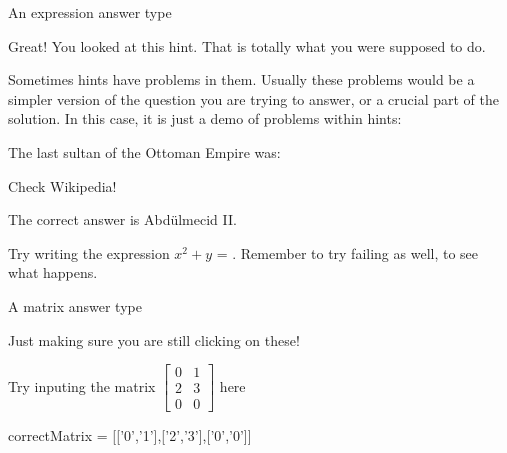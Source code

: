 \documentclass{ximera}
\begin{document}
\begin{problem}
  An expression answer type
  \begin{solution}
    \begin{hint}
      Great!  You looked at this hint.  That is totally what you were supposed to do.
    \end{hint}
    \begin{hint}
      Sometimes hints have problems in them.  Usually these problems would be a simpler version of the question you are trying to answer,
      or a crucial part of the solution.  In this case, it is just a demo of problems within hints:
      \begin{question}
        The last sultan of the Ottoman Empire was:
        \begin{solution}
          \begin{hint}
            Check Wikipedia!
          \end{hint}
          \begin{hint}
            The correct answer is Abdülmecid II.
          \end{hint}
          \begin{multiple-choice}
          \end{multiple-choice}
        \end{solution}
      \end{question}
    \end{hint}
    Try writing the expression $x^2+y$ = .  Remember to try failing as well, to see what happens.
  \end{solution}
\end{problem}

\begin{problem}
  A matrix answer type
  \begin{solution}
    \begin{hint}
      Just making sure you are still clicking on these!
    \end{hint}
    Try inputing the matrix $\begin{bmatrix}  0&1\\2&3\\0&0\end{bmatrix}$ here
    \begin{matrix-answer}[name=M]
      correctMatrix = [['0','1'],['2','3'],['0','0']]
    \end{matrix-answer}
  \end{solution}
\end{problem}
\end{document}
